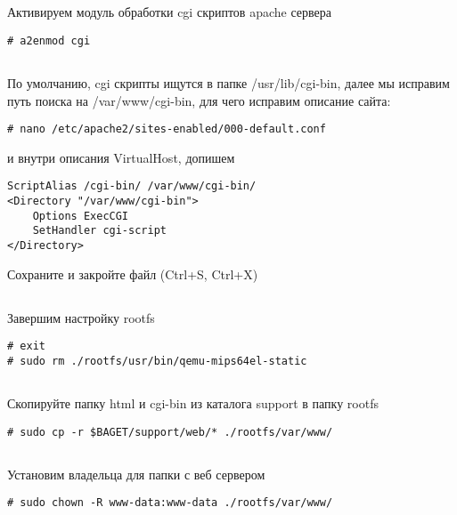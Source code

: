 \subsection{}Активируем модуль обработки cgi скриптов apache сервера
\begin{lstlisting}[style=bash]
# a2enmod cgi
\end{lstlisting}

\subsection{}По умолчанию, cgi скрипты ищутся в папке /usr/lib/cgi-bin, далее мы исправим путь поиска на /var/www/cgi-bin, для чего исправим описание сайта:
\begin{lstlisting}[style=bash]
# nano /etc/apache2/sites-enabled/000-default.conf
\end{lstlisting}
и внутри описания VirtualHost, допишем
\begin{lstlisting}[style=stdout]
ScriptAlias /cgi-bin/ /var/www/cgi-bin/
<Directory "/var/www/cgi-bin">
	Options ExecCGI
	SetHandler cgi-script
</Directory>
\end{lstlisting}
Сохраните и закройте файл (Ctrl+S, Ctrl+X)

\subsection{}Завершим настройку rootfs
\begin{lstlisting}[style=bash]
# exit
# sudo rm ./rootfs/usr/bin/qemu-mips64el-static
\end{lstlisting}

\subsection{}Скопируйте папку html и cgi-bin из каталога support в папку rootfs
\begin{lstlisting}[style=bash]
# sudo cp -r $BAGET/support/web/* ./rootfs/var/www/
\end{lstlisting}

\subsection{}Установим владельца для папки с веб сервером
\begin{lstlisting}[style=bash]
# sudo chown -R www-data:www-data ./rootfs/var/www/
\end{lstlisting}


